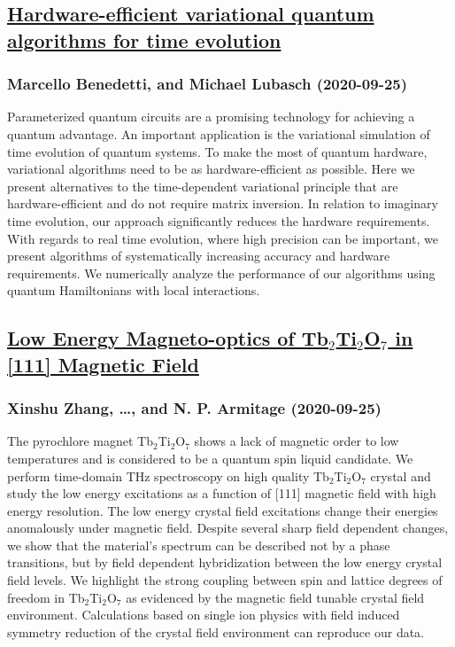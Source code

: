 \subsection*{\href{http://arxiv.org/abs/2009.12361v2}{Hardware-efficient variational quantum algorithms for time evolution}}
\subsubsection*{Marcello Benedetti, and Michael Lubasch (2020-09-25)}
Parameterized quantum circuits are a promising technology for achieving a
quantum advantage. An important application is the variational simulation of
time evolution of quantum systems. To make the most of quantum hardware,
variational algorithms need to be as hardware-efficient as possible. Here we
present alternatives to the time-dependent variational principle that are
hardware-efficient and do not require matrix inversion. In relation to
imaginary time evolution, our approach significantly reduces the hardware
requirements. With regards to real time evolution, where high precision can be
important, we present algorithms of systematically increasing accuracy and
hardware requirements. We numerically analyze the performance of our algorithms
using quantum Hamiltonians with local interactions.

\subsection*{\href{http://arxiv.org/abs/2009.12354v1}{Low Energy Magneto-optics of Tb$_{2}$Ti$_{2}$O$_{7}$ in [111] Magnetic  Field}}
\subsubsection*{Xinshu Zhang, \dots, and N. P. Armitage (2020-09-25)}
The pyrochlore magnet Tb$_{2}$Ti$_{2}$O$_{7}$ shows a lack of magnetic order
to low temperatures and is considered to be a quantum spin liquid candidate. We
perform time-domain THz spectroscopy on high quality Tb$_{2}$Ti$_{2}$O$_{7}$
crystal and study the low energy excitations as a function of [111] magnetic
field with high energy resolution. The low energy crystal field excitations
change their energies anomalously under magnetic field. Despite several sharp
field dependent changes, we show that the material's spectrum can be described
not by a phase transitions, but by field dependent hybridization between the
low energy crystal field levels. We highlight the strong coupling between spin
and lattice degrees of freedom in Tb$_{2}$Ti$_{2}$O$_{7}$ as evidenced by the
magnetic field tunable crystal field environment. Calculations based on single
ion physics with field induced symmetry reduction of the crystal field
environment can reproduce our data.

